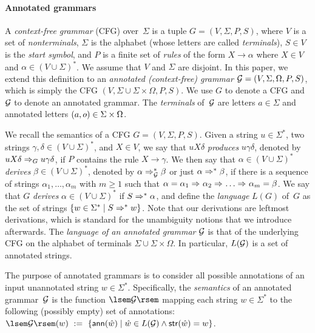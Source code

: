 %
%
%
%
%
%

%
%

\paragraph{Annotated grammars} 
A \emph{context-free grammar} (CFG) over~$\Sigma$ is a tuple $G = (V, \Sigma, P,
S)$, where $V$ is a set of \emph{nonterminals}, $\Sigma$ is the alphabet (whose
letters are called \emph{terminals}),
$S \in V$ is the \emph{start symbol}, and $P$ is a finite set of \emph{rules} of the form $X \to \alpha$
where $X \in V$ and $\alpha \in (V \cup \Sigma)^*$. We assume that $V$ and
$\Sigma$ are disjoint. In this paper, we extend this definition to an
\emph{annotated (context-free) grammar} $\mathcal{G} = (V, \Sigma, \Omega, P, S)$, which
is simply the CFG $(V, \Sigma \cup \Sigma \times \Omega, P, S)$.
%
%
%
%
%
%
We use $G$ to denote a CFG and $\mathcal{G}$ to denote an annotated grammar.
The \emph{terminals} of~$\mathcal{G}$ are letters $a \in \Sigma$ and annotated letters $(a, \oout) \in \Sigma \times \Omega$. 

%
%
We recall the semantics of a CFG $G = (V, \Sigma, P, S)$.
Given a string $u \in \Sigma^*$, two strings $\gamma, \delta \in (V \cup
\Sigma)^*$, and $X \in V$, we say that $u X \delta$ \emph{produces} $u \gamma
\delta$, denoted by $u X \delta \Rightarrow_{G}u \gamma \delta$, if $P$ contains the rule
$X \rightarrow \gamma$. We then say that $\alpha \in (V \cup \Sigma)^*$
\emph{derives} $\beta \in (V \cup \Sigma)^*$, denoted by $\alpha \Rightarrow_{\mathcal{G}}^*
\beta$ or just $\alpha \Rightarrow_{}^* \beta$, if there is a sequence of strings $\alpha_1, \ldots, \alpha_m$ 
with $m\geq 1$
such that $\alpha = \alpha_1 \Rightarrow_{} \alpha_2 \Rightarrow_{} \ldots \Rightarrow_{} \alpha_m =
\beta$. We say that $G$ \emph{derives} $\alpha \in (V \cup \Sigma)^*$ if $S
\Rightarrow_{}^* \alpha$, and define the \emph{language} $L(G)$ of~$G$ as the set of
strings $\{w \in \Sigma^* \mid S \Rightarrow_{}^* w\}$. Note that our derivations
are leftmost derivations, which is standard for the unambiguity notions that we
introduce afterwards.
The \emph{language of an annotated grammar} $\mathcal{G}$ is that of the underlying CFG on the
alphabet of terminals $\Sigma \cup \Sigma \times \Omega$. In particular,
$L(\mathcal{G})$ is a set of annotated strings.

%
%
%
%
%
%
%
%
%
%
%
%
%
%
%
%
%
%
%
%
%
The purpose of annotated grammars is to consider all possible
annotations of an input unannotated string $w \in \Sigma^*$. 
%
%
%
%
%
Specifically, the \emph{semantics} of an annotated grammar~$\mathcal{G}$ is the
function $\sem{\cG}$ mapping each string $w \in \Sigma^*$ to the following
(possibly empty) set of annotations:
$  \sem{\cG}(w) \ := \ \{\ann(\hat{w}) \mid \hat{w} \in
L(\cG) \wedge \str(\hat{w}) = w\}$.

